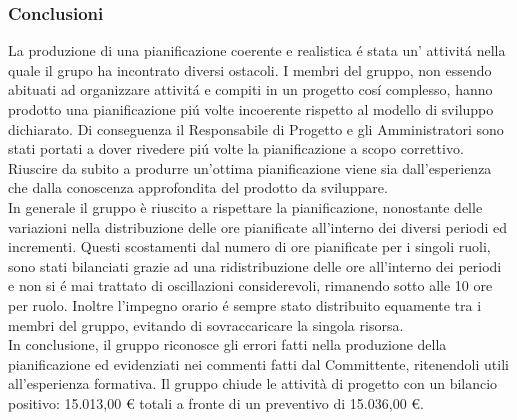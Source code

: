 \subsubsection{Conclusioni}
La produzione di una pianificazione coerente e realistica é stata un' attivitá nella quale il grupo ha incontrato diversi ostacoli. I membri del gruppo, non essendo abituati ad organizzare attivitá e compiti in un progetto cosí complesso, hanno prodotto una pianificazione piú volte incoerente rispetto al modello di sviluppo dichiarato. Di conseguenza il Responsabile di Progetto e gli Amministratori sono stati portati a dover rivedere piú volte la pianificazione a scopo correttivo. Riuscire da subito a produrre un'ottima pianificazione viene sia dall'esperienza che dalla conoscenza approfondita del prodotto da sviluppare.\\
In generale il gruppo è riuscito a rispettare la pianificazione, nonostante delle variazioni nella distribuzione delle ore pianificate all'interno dei diversi periodi ed incrementi. Questi scostamenti dal numero di ore pianificate per i singoli ruoli, sono stati bilanciati grazie ad una ridistribuzione delle ore all'interno dei periodi e non si é mai trattato di oscillazioni considerevoli, rimanendo sotto alle 10 ore per ruolo. Inoltre l'impegno orario é sempre stato distribuito equamente tra i membri del gruppo, evitando di sovraccaricare la singola risorsa.\\
In conclusione, il gruppo riconosce gli errori fatti nella produzione della pianificazione ed evidenziati nei commenti fatti dal Committente, ritenendoli utili all'esperienza formativa.
\newline
\newline
Il gruppo chiude le attività di progetto con un bilancio positivo: 15.013,00 \euro{} totali a fronte di un preventivo di 15.036,00 \euro{}.
